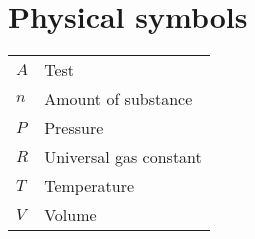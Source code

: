\section*{Physical symbols}
\begin{tabular}{p{}p{}}
   $A$ & Test \\[0.2cm]
   $n$ & Amount of substance \\[0.2cm]
   $P$ & Pressure \\[0.2cm]
   $R$ & Universal gas constant \\[0.2cm]
   $T$ & Temperature \\[0.2cm]
   $V$ & Volume \\[0.2cm]
\end{tabular}
